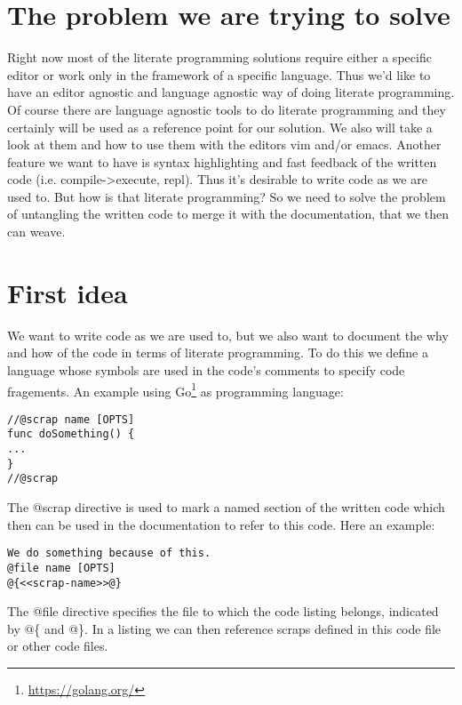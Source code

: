 \documentclass[11pt]{article}
\date{\today}
\title{}
\begin{document}
\tableofcontents


\section{The problem we are trying to solve}
\label{sec:orgheadline1}
Right now most of the literate programming solutions require either a specific
editor or work only in the framework of a specific language. Thus we'd like to
have an editor agnostic and language agnostic way of doing literate programming.
Of course there are language agnostic tools to do literate programming and they
certainly will be used as a reference point for our solution. We also will take
a look at them and how to use them with the editors vim and/or emacs. Another
feature we want to have is syntax highlighting and fast feedback of the written
code (i.e. compile->execute, repl). Thus it's desirable to write code as we are
used to. But how is that literate programming? So we need to solve the problem
of untangling the written code to merge it with the documentation, that we
then can weave.

\section{First idea}
\label{sec:orgheadline4}
We want to write code as we are used to, but we also want to document the
why and how of the code in terms of literate programming. To do this we define
a language whose symbols are used in the code's comments to specify code
fragements. An example using Go\footnote{\url{https://golang.org/}} as programming language:

\begin{verbatim}
//@scrap name [OPTS]
func doSomething() {
...
}
//@scrap
\end{verbatim}

The @scrap directive is used to mark a named section of the written code
which then can be used in the documentation to refer to this code. Here an
example:

\begin{verbatim}
We do something because of this.
@file name [OPTS]
@{<<scrap-name>>@}
\end{verbatim}

The @file directive specifies the file to which the code listing belongs, 
indicated by @\{ and @\}. In a listing we can then reference scraps defined in
this code file or other code files.
\end{document}
